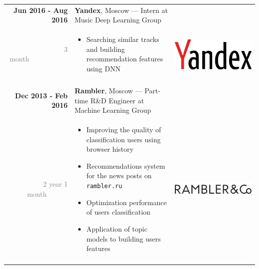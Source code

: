 \documentclass[a4paper,10pt]{article} %
\begin{document}
\begin{tabular}{r|p{11.5cm}c}
\textbf{Jun 2016 - Aug 2016}
 & \textbf{Yandex}, Moscow --- Intern at Music Deep Learning Group \\ 
\textcolor{gray}{3 month}~~~~~~~~~~~&  \footnotesize{
  
  \vspace{-0.25cm}
  \begin{itemize}
      \item Searching similar tracks and building recommendation features using DNN
  \end{itemize}
  \vspace{-0.3cm}
} 
& \multirow{2}{*}{\includegraphics[scale=0.02]{img/yandex}}\\
\multicolumn{2}{c}{}\\

\textbf{Dec 2013 - Feb 2016}
 & \textbf{Rambler}, Moscow --- Part-time R\&D Engineer at Machine Learning Group \\ 
\textcolor{gray}{2 year 1 month}~~~~~~&  \footnotesize{
  
  \vspace{-0.25cm}
  \begin{itemize}
      \item Improving the quality of classification users using browser history
  	  \item Recommendations system for the news posts on \texttt{rambler.ru}
      \item Optimization performance of users classification
      \item Application of topic models to building users features 
  \end{itemize}
  \vspace{-0.3cm}
} 
& \multirow{2}{*}{\includegraphics[scale=0.12]{img/ramblerco}}\\
\multicolumn{2}{c}{}\\


\end{tabular}
\end{document}
